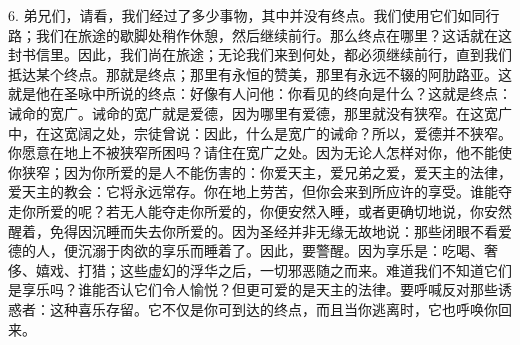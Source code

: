 6. 弟兄们，请看，我们经过了多少事物，其中并没有终点。我们使用它们如同行路；我们在旅途的歇脚处稍作休憩，然后继续前行。那么终点在哪里？这话就在这封书信里。因此，我们尚在旅途；无论我们来到何处，都必须继续前行，直到我们抵达某个终点。那就是终点；那里有永恒的赞美，那里有永远不辍的阿肋路亚。这就是他在圣咏中所说的终点：好像有人问他：你看见的终向是什么？这就是终点：诫命的宽广。诫命的宽广就是爱德，因为哪里有爱德，那里就没有狭窄。在这宽广中，在这宽阔之处，宗徒曾说：因此，什么是宽广的诫命？所以，爱德并不狭窄。你愿意在地上不被狭窄所困吗？请住在宽广之处。因为无论人怎样对你，他不能使你狭窄；因为你所爱的是人不能伤害的：你爱天主，爱兄弟之爱，爱天主的法律，爱天主的教会：它将永远常存。你在地上劳苦，但你会来到所应许的享受。谁能夺走你所爱的呢？若无人能夺走你所爱的，你便安然入睡，或者更确切地说，你安然醒着，免得因沉睡而失去你所爱的。因为圣经并非无缘无故地说：那些闭眼不看爱德的人，便沉溺于肉欲的享乐而睡着了。因此，要警醒。因为享乐是：吃喝、奢侈、嬉戏、打猎；这些虚幻的浮华之后，一切邪恶随之而来。难道我们不知道它们是享乐吗？谁能否认它们令人愉悦？但更可爱的是天主的法律。要呼喊反对那些诱惑者：这种喜乐存留。它不仅是你可到达的终点，而且当你逃离时，它也呼唤你回来。\par

